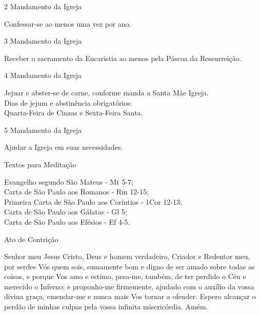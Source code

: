 \documentclass{book}
\begin{document}
\begin{center}
    2\textordmasculine{} Mandamento da Igreja
\end{center}
\begin{flushleft}
    Confessar-se ao menos uma vez por ano.
\end{flushleft}
\begin{center}
    3\textordmasculine{} Mandamento da Igreja
\end{center}
\begin{flushleft}
    Receber o sacramento da Eucaristia ao menos pela Páscoa da Ressurreição.
\end{flushleft}
\begin{center}
    4\textordmasculine{} Mandamento da Igreja
\end{center}
\begin{flushleft}
    Jejuar e abster-se de carne, conforme manda a Santa Mãe Igreja. \\
    \hfill{} \break{}
    Dias de jejum e abstinência obrigatórios: \\
    Quarta-Feira de Cinzas e Sexta-Feira Santa.
\end{flushleft}
\begin{center}
    5\textordmasculine{} Mandamento da Igreja
\end{center}
\begin{flushleft}
    Ajudar a Igreja em suas necessidades.
\end{flushleft}
\newpage
\begin{center}
    Textos para Meditação
\end{center}
\begin{flushleft}
    Evangelho segundo São Mateus - \textcolor{VioletRed2}{Mt 5-7}; \\
    Carta de São Paulo aos Romanos - \textcolor{VioletRed2}{Rm 12-15}; \\
    Primeira Carta de São Paulo aos Coríntios - \textcolor{VioletRed2}{1Cor 12-13}; \\
    Carta de São Paulo aos Gálatas - \textcolor{VioletRed2}{Gl 5}; \\
    Carta de São Paulo aos Efésios - \textcolor{VioletRed2}{Ef 4-5}.
\end{flushleft}
\begin{center}
    Ato de Contrição
\end{center}
\begin{flushleft}
    Senhor meu Jesus Cristo, Deus e homem verdadeiro, Criador e Redentor meu, por serdes Vós quem sois, sumamente bom e digno de ser amado sobre todas as coisas, e porque Vos amo e estimo, pesa-me, também, de ter perdido o Céu e merecido o Inferno; e proponho-me firmemente, ajudado com o auxílio da vossa divina graça, emendar-me e nunca mais Vos tornar a ofender. Espero alcançar o perdão de minhas culpas pela vossa infinita misericórdia. Amém.
\end{flushleft}
\end{document}
